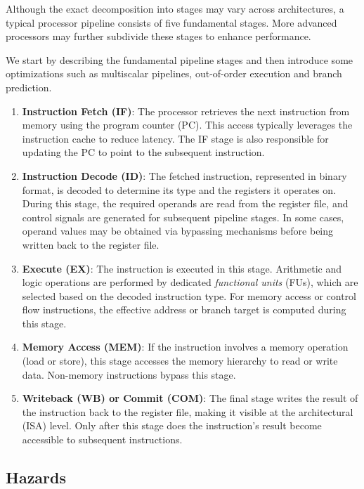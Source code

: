 Although the exact decomposition into stages may vary across architectures, a typical processor pipeline consists of five fundamental stages. More advanced processors may further subdivide these stages to enhance performance.

We start by describing the fundamental pipeline stages and then introduce some optimizations such as multiscalar pipelines, out-of-order execution and branch prediction.

\begin{enumerate}
    \item \textbf{Instruction Fetch (IF)}: The processor retrieves the next instruction from memory using the program counter (PC). This access typically leverages the instruction cache to reduce latency. The IF stage is also responsible for updating the PC to point to the subsequent instruction.

    \item \textbf{Instruction Decode (ID)}: The fetched instruction, represented in binary format, is decoded to determine its type and the registers it operates on. During this stage, the required operands are read from the register file, and control signals are generated for subsequent pipeline stages. In some cases, operand values may be obtained via bypassing mechanisms before being written back to the register file.

    \item \textbf{Execute (EX)}: The instruction is executed in this stage. Arithmetic and logic operations are performed by dedicated \textit{functional units} (FUs), which are selected based on the decoded instruction type. For memory access or control flow instructions, the effective address or branch target is computed during this stage.

    \item \textbf{Memory Access (MEM)}: If the instruction involves a memory operation (load or store), this stage accesses the memory hierarchy to read or write data. Non-memory instructions bypass this stage.

    \item \textbf{Writeback (WB) or Commit (COM)}: The final stage writes the result of the instruction back to the register file, making it visible at the architectural (ISA) level. Only after this stage does the instruction's result become accessible to subsequent instructions.
\end{enumerate}


\subsection{Hazards}

